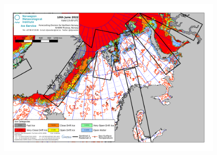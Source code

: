 \documentclass[../main/thesis.tex]{subfiles}
\begin{document}
\begin{figure}
    \includegraphics[width=\textwidth]{../figures/general_latest.png}
\end{figure}


\biblio
\end{document}
